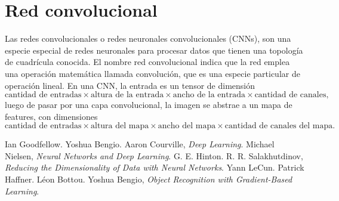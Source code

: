 \documentclass[12pt,a4paper]{article}
\begin{document}
\section{Red convolucional}
Las redes convolucionales o redes neuronales convolucionales (CNNs), son una especie especial de redes neuronales para procesar datos que tienen una topología de cuadrícula conocida.
El nombre red convolucional indica que la red emplea una operación matemática llamada convolución, que es una especie particular de operación lineal.
En una CNN, la entrada es un tensor de dimensión
$$
\text{cantidad de entradas} \times \text{altura de la entrada} \times \text{ancho de la entrada} \times \text{cantidad de canales},
$$
luego de pasar por una capa convolucional, la imagen se abstrae a un mapa de features, con dimensiones
$$
\text{cantidad de entradas} \times \text{altura del mapa} \times \text{ancho del mapa} \times \text{cantidad de canales del mapa}.
$$

\newpage
\begin{thebibliography}{9}
 Ian Goodfellow. Yoshua Bengio. Aaron Courville, \emph{Deep Learning}.
 Michael Nielsen, \emph{Neural Networks and Deep Learning}.
 G. E. Hinton. R. R. Salakhutdinov, \emph{Reducing the Dimensionality of Data with Neural Networks}.
 Yann LeCun. Patrick Haffner. Léon Bottou. Yoshua Bengio, \emph{Object Recognition with Gradient-Based Learning}.

\end{thebibliography}
\end{document}

